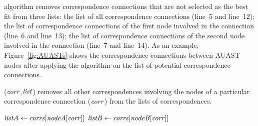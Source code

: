  algorithm removes correspondence connections that are not selected as the best fit from three lists: the list of all correspondence connections (line~5 and line~12);
the list of correspondence connections of the first node involved in the connection (line~6 and line~13); the list of correspondence connections of the second node involved in the connection (line~7 and line~14). As an example, Figure~\ref{fig:AUASTs} shows the correspondence connections between AUAST nodes after applying the  algorithm on the list of potential correspondence connections.

\begin{algorithm}
\caption{($\mathit{corr}$,$\mathit{list}$) removes all other correspondences involving the nodes of a particular correspondence connection ($\mathit{corr}$) from the lists of correspondences.}
\label{removeOtherCEs}
  \begin{algorithmic}[1]
  \RemoveOtherCEs
       \State $\mathit{listA} \gets \mathit{corrs}[\mathit{nodeA}[\mathit{corr}]]$
	   \State $\mathit{listB} \gets \mathit{corrs}[\mathit{nodeB}[\mathit{corr}]]$
	   		 \EndIf
	   \EndFor		
	 	 	 		 
	   		 \EndIf
	   \EndFor	  	
  \end{algorithmic}
\end{algorithm}




